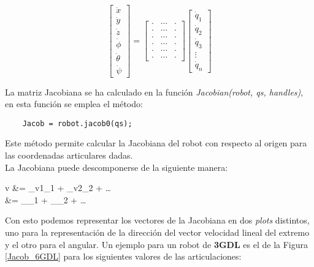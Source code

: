 \documentclass[a4paper, fontsize=11pt]{scrartcl} %
\numberwithin{equation}{section} %
\numberwithin{figure}{section} %
\numberwithin{table}{section} %
\newenvironment{myalign}{\par\nobreak\large\noindent\align}{\endalign} %
\begin{document}
	\[
	\begin{bmatrix}
	\dot{x}\\
	\dot{y}\\
	\dot{z}\\
	\dot{\phi}\\
	\dot{\theta}\\
	\dot{\psi}
	\end{bmatrix}
	=
	\begin{bmatrix}
	\cdotp & \cdots & \cdotp\\
	\cdotp & \cdots & \cdotp\\
	\cdotp & \cdots & \cdotp\\
	\cdotp & \cdots & \cdotp\\
	\cdotp & \cdots & \cdotp\\
	\cdotp & \cdots & \cdotp
	\end{bmatrix}
	\begin{bmatrix}
	\dot{q}_1\\
	\dot{q}_2\\
	\dot{q}_3\\
	\vdots\\
	\dot{q}_n
	\end{bmatrix}
	\]
	
	La matriz Jacobiana se ha calculado en la función \textit{Jacobian(robot, qs, handles)}, en esta función se emplea el método:
	
	\begin{lstlisting}
	Jacob = robot.jacob0(qs);   
	\end{lstlisting}
	Este método permite calcular la Jacobiana del robot con respecto al origen para las coordenadas articulares dadas.\\
	
	La Jacobiana puede descomponerse de la siguiente manera:
	
	\begin{myalign}
		\begin{split}
			v &= _{v1}\cdot {}_1 + _{v2}\cdot {}_2 + \ldots\\
	   \omega &= _{}\cdot {}_1 + _{}\cdot {}_2 + \ldots
		\end{split}
	\end{myalign}
	Con esto podemos representar los vectores de la Jacobiana en dos \textit{plots} distintos, uno para la representación de la dirección del vector velocidad lineal del extremo y el otro para el angular. Un ejemplo para un robot de \textbf{3GDL} es el de la Figura \ref{Jacob_6GDL} para los siguientes valores de las articulaciones:
	
\end{document}
